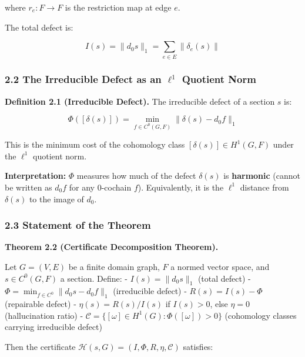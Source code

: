 \documentclass[
]{article}
\begin{document}
where \(r_e: F \to F\) is the restriction map at edge \(e\).

The total defect is:

\[I(s) = \|d_0 s\|_1 = \sum_{e \in E} \|\delta_e(s)\|\]

\subsubsection{\texorpdfstring{2.2 The Irreducible Defect as an
\(\ell^1\) Quotient
Norm}{2.2 The Irreducible Defect as an \textbackslash ell\^{}1 Quotient Norm}}\label{the-irreducible-defect-as-an-ell1-quotient-norm}

\textbf{Definition 2.1 (Irreducible Defect).} The irreducible defect of
a section \(s\) is:

\[\Phi([\delta(s)]) = \min_{f \in C^0(G, F)} \|\delta(s) - d_0 f\|_1\]

This is the minimum cost of the cohomology class
\([\delta(s)] \in H^1(G, F)\) under the \(\ell^1\) quotient norm.

\textbf{Interpretation:} \(\Phi\) measures how much of the defect
\(\delta(s)\) is \textbf{harmonic} (cannot be written as \(d_0 f\) for
any 0-cochain \(f\)). Equivalently, it is the \(\ell^1\) distance from
\(\delta(s)\) to the image of \(d_0\).

\subsubsection{2.3 Statement of the
Theorem}\label{statement-of-the-theorem}

\textbf{Theorem 2.2 (Certificate Decomposition Theorem).}

Let \(G = (V, E)\) be a finite domain graph, \(F\) a normed vector
space, and \(s \in C^0(G, F)\) a section. Define: -
\(I(s) = \|d_0 s\|_1\) (total defect) -
\(\Phi = \min_{f \in C^0} \|d_0 s - d_0 f\|_1\) (irreducible defect) -
\(R(s) = I(s) - \Phi\) (repairable defect) - \(\eta(s) = R(s) / I(s)\)
if \(I(s) > 0\), else \(\eta = 0\) (hallucination ratio) -
\(\mathcal{C} = \{[\omega] \in H^1(G) : \Phi([\omega]) > 0\}\)
(cohomology classes carrying irreducible defect)

Then the certificate
\(\mathcal{H}(s, G) = (I, \Phi, R, \eta, \mathcal{C})\) satisfies:
\end{document}
